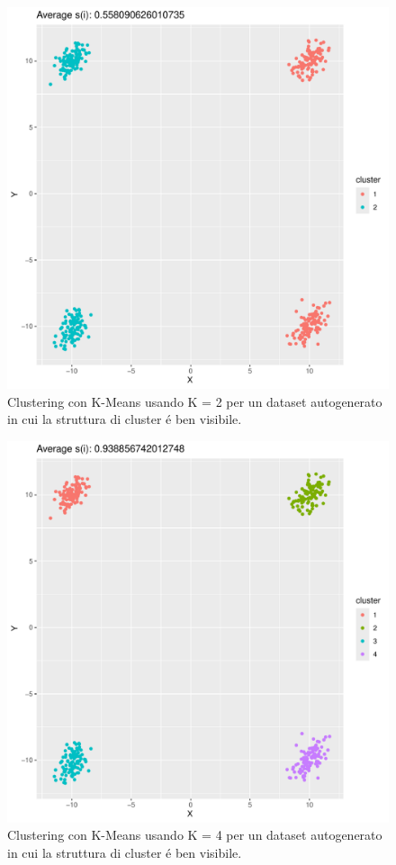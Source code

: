 \documentclass[italian]{article}
\begin{document}
		\begin{figure}
			\includegraphics[width = \textwidth]{doc/clusters-2.pdf}
			\caption{Clustering con K-Means usando K = 2 per un dataset
			autogenerato in cui la struttura di cluster é ben visibile. }
			\label{fig:c2}
		\end{figure}

		\begin{figure}
			\includegraphics[width = \textwidth]{doc/clusters-4.pdf}
			\caption{Clustering con K-Means usando K = 4 per un dataset
			autogenerato in cui la struttura di cluster é ben visibile. }
			\label{fig:c4}
		\end{figure}
\end{document}
